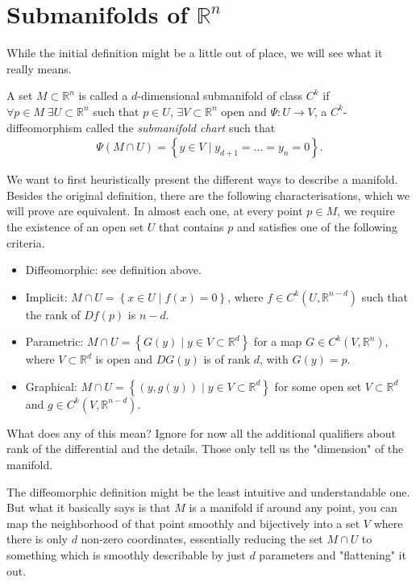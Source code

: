 \section{Submanifolds of $\mathbb{R}^{n}$}

While the initial definition might be a little out of place, we will see what it really means.

\begin{definition}[Submanifold]\label{def:submanifold}
	A set $M \subset \mathbb{R}^{n}$ is called a $d$-dimensional submanifold of class $C^{k}$ if $\forall p \in M \; \exists U \subset \mathbb{R}^{n}$ such that $p \in U$, $\exists V \subset \mathbb{R}^{n}$ open and $\Psi: U \to V$, a $C^{k}$-diffeomorphism called the \textit{submanifold chart} such that
	\begin{align*}
		\Psi(M \cap U) = \left\{ y \in V \mid y_{d+1} = \dots = y_{n} = 0 \right\}.
	\end{align*}
\end{definition}

We want to first heuristically present the different ways to describe a manifold. Besides the original definition, there are the following characterisations, which we will prove are equivalent. In almost each one, at every point $p \in M$, we require the existence of an open set $U$ that contains $p$ and satisfies one of the following criteria.
\begin{itemize}
	\item Diffeomorphic: see definition above.
	\item Implicit: $M \cap U = \left\{ x \in U \mid f(x) = 0 \right\}$, where $f \in C^{k}(U, \mathbb{R}^{n-d})$ such that the rank of $Df(p)$ is $n-d$.
	\item Parametric: $M \cap U = \left\{ G(y) \mid y \in V \subset \mathbb{R}^{d} \right\}$ for a map $G \in C^{k}(V, \mathbb{R}^{n})$, where $V \subset \mathbb{R}^{d}$ is open and $DG(y)$ is of rank $d$, with $G(y) = p$.
	\item Graphical: $M \cap U = \left\{ (y, g(y)) \mid y \in V \subset \mathbb{R}^{d} \right\}$ for some open set $V \subset \mathbb{R}^{d}$ and $g \in C^{k}(V, \mathbb{R}^{n-d})$.
\end{itemize}

What does any of this mean? Ignore for now all the additional qualifiers about rank of the differential and the details. Those only tell us the "dimension" of the manifold.

The diffeomorphic definition might be the least intuitive and understandable one. But what it basically says is that $M$ is a manifold if around any point, you can map the neighborhood of that point smoothly and bijectively into a set $V$ where there is only $d$ non-zero coordinates, essentially reducing the set $M \cap U$ to something which is smoothly describable by just $d$ parameters and "flattening" it out.

